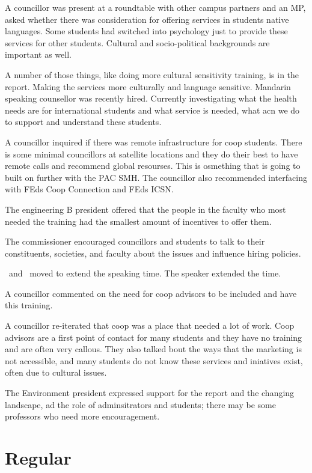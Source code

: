 A councillor was present at a roundtable with other campus partners and an MP,
asked whether there was consideration for offering services in students native
languages. Some students had switched into psychology just to provide these
services for other students. Cultural and socio-political backgrounds are 
important as well. 

A number of those things, like doing more cultural sensitivity training, is in
the report. Making the services more culturally and language sensitive. Mandarin
speaking counsellor was recently hired. Currently investigating what the health
needs are for international students and what service is needed, what acn we 
do to support and understand these students.

A councillor inquired if there was remote infrastructure for coop students. 
There is some minimal councillors at satellite locations and they do their
best to have remote calls and recommend global resourses. This is osmething
that is going to built on further with the PAC SMH. The councillor also 
recommended interfacing with FEds Coop Connection and FEds ICSN. 

The engineering B president offered that the people in the faculty who most
needed the training had the smallest amount of incentives to offer them. 

The commissioner encouraged councillors and students to talk to their 
constituents, societies, and faculty about the issues and influence hiring
policies.

\seneca\ and \rebecca\ moved to extend the speaking time. The speaker extended 
the time.

A councillor commented on the need for coop advisors to be included and have
this training. 

A councillor re-iterated that coop was a place that needed a lot of work. 
Coop advisors are a first point of contact for many students and they have
no training and are often very callous. They also talked bout the ways that
the marketing is not accessible, and many students do not know these services
and iniatives exist, often due to cultural issues.

The Environment president expressed support for the report and the changing
landscape, ad the role of adminsitrators and students; there may be some 
professors who need more encouragement.


\section*{Regular}

